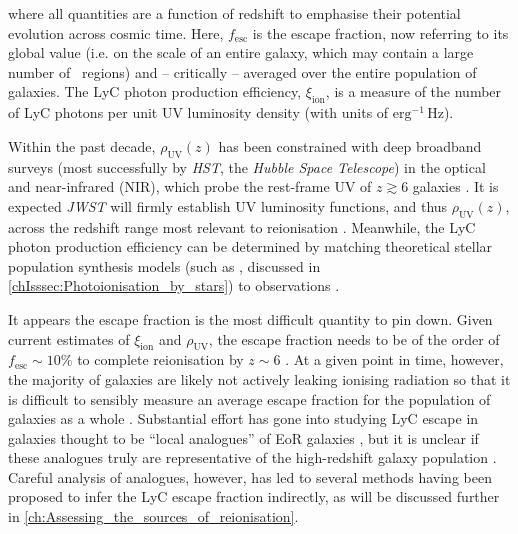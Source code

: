 \noindent where all quantities are a function of redshift to emphasise their potential evolution across cosmic time. Here, $f_\text{esc}$ is the escape fraction, now referring to its global value (i.e. on the scale of an entire galaxy, which may contain a large number of \HII\ regions) and -- critically -- averaged over the entire population of galaxies. The LyC photon production efficiency, $\xi_\text{ion}$, is a measure of the number of LyC photons per unit UV luminosity density (with units of $\mathrm{erg^{-1} \, Hz}$).

Within the past decade, $\rho_\text{UV} (z)$ has been constrained with deep broadband surveys (most successfully by \textit{HST}, the \textit{Hubble Space Telescope}) in the optical and near-infrared (NIR), which probe the rest-frame UV of $z \gtrsim 6$ galaxies \citep[typically around $\lambda_\text{emit} \sim 1500 \, \Angstrom$; e.g.][]{2021AJ....162...47B}. It is expected \textit{JWST} will firmly establish UV luminosity functions, and thus $\rho_\text{UV} (z)$, across the redshift range most relevant to reionisation \citep[e.g.][]{2022arXiv220801612H}. Meanwhile, the LyC photon production efficiency can be determined by matching theoretical stellar population synthesis models (such as , discussed in \cref{chIsssec:Photoionisation_by_stars}) to observations \citep[e.g.][]{2015MNRAS.454.1393S, 2017MNRAS.467.3306S, 2018MNRAS.479.3264C}.

It appears the escape fraction is the most difficult quantity to pin down. Given current estimates of $\xi_\text{ion}$ and $\rho_\text{UV}$, the escape fraction needs to be of the order of $f_\text{esc} \sim 10\%$ to complete reionisation by $z \sim 6$ \citep[e.g.][]{2015ApJ...802L..19R, 2018MNRAS.479..994R, 2020MNRAS.498..164K}. At a given point in time, however, the majority of galaxies are likely not actively leaking ionising radiation so that it is difficult to sensibly measure an average escape fraction for the population of galaxies as a whole \citep[e.g.][]{2022MNRAS.512.5960M}. Substantial effort has gone into studying LyC escape in galaxies thought to be ``local analogues'' of EoR galaxies \citep[e.g.][]{2016ApJ...827..126B, 2019ApJ...874...93B, 2017MNRAS.472.2608S, 2019MNRAS.488.3492S, 2021MNRAS.503.6112S, 2016MNRAS.461.3683I, 2016Natur.529..178I, 2018MNRAS.474.4514I, 2018MNRAS.478.4851I, 2021MNRAS.503.1734I, 2018ApJ...855...96H, 2019ApJ...885...57W, 2021ApJ...916....3W}, but it is unclear if these analogues truly are representative of the high-redshift galaxy population \citep[e.g.][]{2022MNRAS.tmp.2470K}. Careful analysis of analogues, however, has led to several methods having been proposed to infer the LyC escape fraction indirectly, as will be discussed further in \cref{ch:Assessing_the_sources_of_reionisation}.

